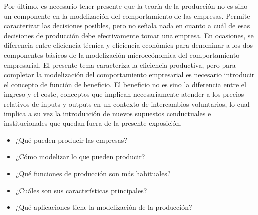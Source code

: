 \documentclass{nuevotema}
\begin{document}
Por último, es necesario tener presente que la teoría de la producción no es sino un componente en la modelización del comportamiento de las empresas. Permite caracterizar las decisiones posibles, pero no señala nada en cuanto a cuál de esas decisiones de producción debe efectivamente tomar una empresa. En ocasiones, se diferencia entre eficiencia técnica y eficiencia económica para denominar a los dos componentes básicos de la modelización microecónomica del comportamiento empresarial. El presente tema caracteriza la eficiencia productiva, pero para completar la modelización del comportamiento empresarial es necesario introducir el concepto de función de beneficio. El beneficio no es sino la diferencia entre el ingreso y el coste, conceptos que implican necesariamente atender a los precios relativos de inputs y outputs en un contexto de intercambios voluntarios, lo cual implica a su vez la introducción de nuevos supuestos conductuales e institucionales que quedan fuera de la presente exposición.

\begin{itemize}
	\item ¿Qué pueden producir las empresas?
	\item ¿Cómo modelizar lo que pueden producir?
	\item ¿Qué funciones de producción son más habituales?
	\item ¿Cuáles son sus características principales?
	\item ¿Qué aplicaciones tiene la modelización de la producción?
\end{itemize}

\esquemacorto
\end{document}
